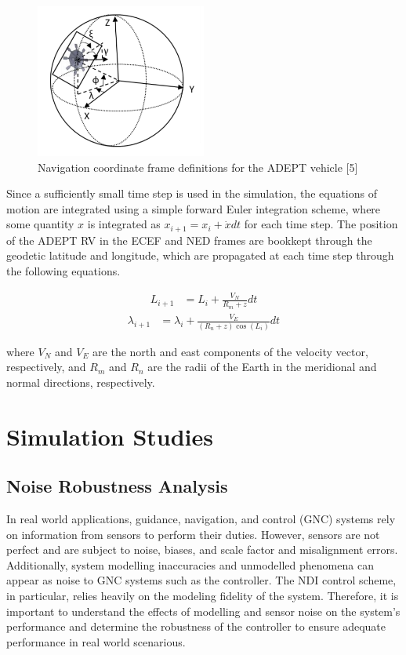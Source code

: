\documentclass[12pt]{article}
\numberwithin{equation}{section}
\numberwithin{figure}{section}
\numberwithin{table}{section}
\begin{document}
\begin{figure}[H]
  \centering
  \includegraphics[width=0.5\textwidth]{Figures/ADEPT_Nav_Frame.png}
  \caption{Navigation coordinate frame definitions for the ADEPT vehicle [5]}
  \label{fig:ADEPT_Nav_Coordinate_Frames}
\end{figure}

Since a sufficiently small time step is used in the simulation, the equations of motion are integrated using a simple forward Euler integration scheme, where some quantity $x$ is integrated as $x_{i+1} = x_i + \dot{x}dt$ for each time step. The position of the ADEPT RV in the ECEF and NED frames are bookkept through the geodetic latitude and longitude, which are propagated at each time step through the following equations.

\begin{align}
L_{i+1} &= L_i + \frac{V_{N}}{R_m + z} dt
\end{align}
\begin{align}
\lambda_{i+1} &= \lambda_i + \frac{V_{E}}{(R_n + z)\cos(L_i)} dt
\end{align}

where $V_N$ and $V_E$ are the north and east components of the velocity vector, respectively, and $R_m$ and $R_n$ are the radii of the Earth in the meridional and normal directions, respectively.

\section{Simulation Studies}
\subsection{Noise Robustness Analysis}
In real world applications, guidance, navigation, and control (GNC) systems rely on information from sensors to perform their duties. However, sensors are not perfect and are subject to noise, biases, and scale factor and misalignment errors. Additionally, system modelling inaccuracies and unmodelled phenomena can appear as noise to GNC systems such as the controller. The NDI control scheme, in particular, relies heavily on the modeling fidelity of the system. Therefore, it is important to understand the effects of modelling and sensor noise on the system's performance and determine the robustness of the controller to ensure adequate performance in real world scenarious.
\end{document}
